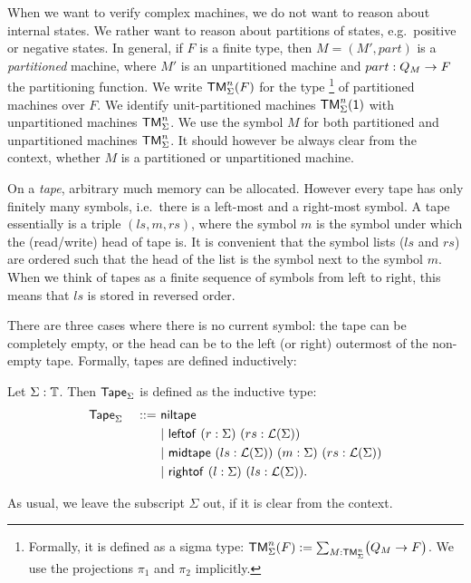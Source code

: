 When we want to verify complex machines, we do not want to reason about internal states.  We rather want to reason about partitions of states, e.g.\
positive or negative states.  In general, if $F$ is a finite type, then $M = (M', part)$ is a \emph{partitioned} machine, where $M'$ is an
unpartitioned machine and $part : Q_M \rightarrow F$ the partitioning function.  We write $\mathsf{TM}_\Sigma^n(F)$ for the type%
\footnote{Formally, it is defined as a sigma type: $\mathsf{TM}_\Sigma^n(F) := \sum_{M:\mathsf{TM}_\Sigma^n}\bigl(Q_M \rightarrow F\bigr)$.  We use the projections
  $\pi_1$ and $\pi_2$ implicitly.}%
of partitioned machines over $F$.  We identify unit-partitioned machines $\mathsf{TM}_\Sigma^n(\mathsf{1})$ with unpartitioned machines $\mathsf{TM}_\Sigma^n$.  We use the
symbol $M$ for both partitioned and unpartitioned machines $\mathsf{TM}_\Sigma^n$.  It should however be always clear from the context, whether $M$ is a
partitioned or unpartitioned machine.

On a \emph{tape}, arbitrary much memory can be allocated.  However every tape has only finitely many symbols, i.e.\ there is a left-most and a
right-most symbol.  A tape essentially is a triple $(ls,m,rs)$, where the symbol $m$ is the symbol under which the (read/write) head of tape is.  It
is convenient that the symbol lists ($ls$ and $rs$) are ordered such that the head of the list is the symbol next to the symbol $m$.  When we think of
tapes as a finite sequence of symbols from left to right, this means that $ls$ is stored in reversed order.

There are three cases where there is no current symbol: the tape can be completely empty, or the head can be to the left (or right) outermost of the
non-empty tape.  Formally, tapes are defined inductively:

\begin{definition}[Tape][tape]
  \label{def:tape}
  Let $\Sigma : \mathbb{T}$.  Then $\mathsf{Tape}_\Sigma$ is defined as the inductive type:
  \begin{alignat*}{2}
    & \mathsf{Tape}_\Sigma &~::=~& \mathsf{niltape} \\
    &&& |~ \mathsf{leftof}  ~ (r:\Sigma) ~ (rs:\mathcal{L}(\Sigma)) \\
    &&& |~ \mathsf{midtape} ~ (ls:\mathcal{L}(\Sigma)) ~ (m:\Sigma) ~ (rs:\mathcal{L}(\Sigma)) \\
    &&& |~ \mathsf{rightof} ~ (l:\Sigma) ~ (ls:\mathcal{L}(\Sigma)).
  \end{alignat*}
\end{definition}

As usual, we leave the subscript $\Sigma$ out, if it is clear from the context.


